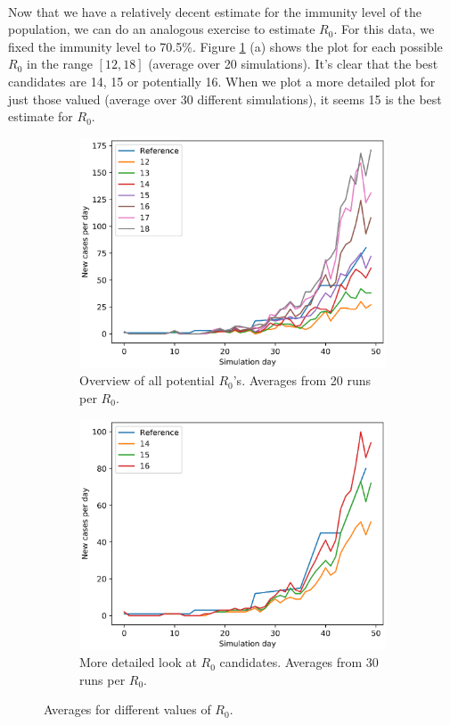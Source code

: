\documentclass[runningheads]{llncs}
\begin{document}
\paragraph{} Now that we have a relatively decent estimate for the immunity level of the population, we can do an analogous exercise to estimate $R_0$. For this data, we fixed the immunity level to 70.5\%. Figure \ref{R0EstPlot} (a) shows the plot for each possible $R_0$ in the range $[12, 18]$ (average over 20 simulations). It's clear that the best candidates are 14, 15 or potentially 16. When we plot a more detailed plot for just those valued (average over 30 different simulations), it seems 15 is the best estimate for $R_0$.

\begin{figure}[H]
	\centering
	\begin{subfigure}[b]{0.7\linewidth}
		\includegraphics[width=\textwidth]{R0_all_20runs.eps}
		\caption{Overview of all potential $R_0$'s. Averages from 20 runs per $R_0$.} 	
	\end{subfigure}
	\begin{subfigure}[b]{0.7\linewidth}
		\includegraphics[width=\textwidth]{R0_detail_30runs.eps}
		\caption{More detailed look at $R_0$ candidates. Averages from 30 runs per $R_0$.} 
	\end{subfigure}
	\caption{Averages for different values of $R_0$.}
	\label{R0EstPlot}
\end{figure}
\end{document}
